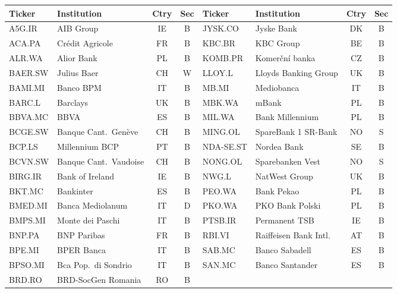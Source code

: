 \documentclass[12pt,a4paper]{article}
\begin{document}
\begin{center}
\footnotesize
\setlength{\tabcolsep}{4pt}
\begin{tabular}{llcc|llcc}
\hline
\textbf{Ticker} & \textbf{Institution} & \textbf{Ctry} & \textbf{Sec} &
\textbf{Ticker} & \textbf{Institution} & \textbf{Ctry} & \textbf{Sec} \\
\hline
A5G.IR   & AIB Group              & IE & B &
JYSK.CO  & Jyske Bank             & DK & B \\
ACA.PA   & Crédit Agricole        & FR & B &
KBC.BR   & KBC Group              & BE & B \\
ALR.WA   & Alior Bank             & PL & B &
KOMB.PR  & Komerční banka         & CZ & B \\
BAER.SW  & Julius Baer            & CH & W &
LLOY.L   & Lloyds Banking Group   & UK & B \\
BAMI.MI  & Banco BPM              & IT & B &
MB.MI    & Mediobanca             & IT & B \\
BARC.L   & Barclays               & UK & B &
MBK.WA   & mBank                  & PL & B \\
BBVA.MC  & BBVA                   & ES & B &
MIL.WA   & Bank Millennium        & PL & B \\
BCGE.SW  & Banque Cant.\ Genève   & CH & B &
MING.OL  & SpareBank 1 SR-Bank    & NO & S \\
BCP.LS   & Millennium BCP         & PT & B &
NDA-SE.ST& Nordea Bank            & SE & B \\
BCVN.SW  & Banque Cant.\ Vaudoise & CH & B &
NONG.OL  & Sparebanken Vest       & NO & S \\
BIRG.IR  & Bank of Ireland        & IE & B &
NWG.L    & NatWest Group          & UK & B \\
BKT.MC   & Bankinter              & ES & B &
PEO.WA   & Bank Pekao             & PL & B \\
BMED.MI  & Banca Mediolanum       & IT & D &
PKO.WA   & PKO Bank Polski        & PL & B \\
BMPS.MI  & Monte dei Paschi       & IT & B &
PTSB.IR  & Permanent TSB          & IE & B \\
BNP.PA   & BNP Paribas            & FR & B &
RBI.VI   & Raiffeisen Bank Intl.  & AT & B \\
BPE.MI   & BPER Banca             & IT & B &
SAB.MC   & Banco Sabadell         & ES & B \\
BPSO.MI  & Bca Pop.\ di Sondrio   & IT & B &
SAN.MC   & Banco Santander        & ES & B \\
BRD.RO   & BRD-SocGen Romania     & RO & B &

\end{tabular}
\end{center}
\end{document}
